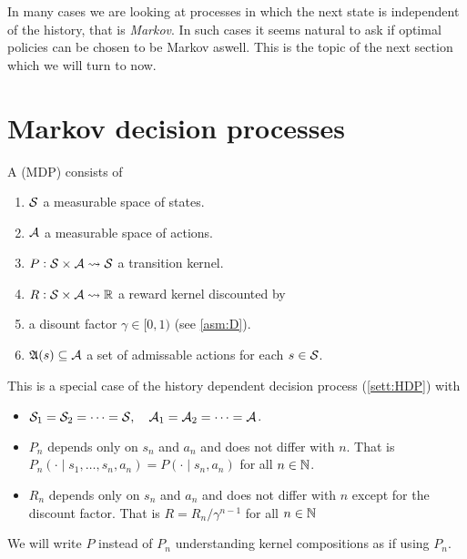 In many cases we are looking at processes
in which the next state is independent of the history,
that is \emph{Markov}.
In such cases it seems natural to ask if optimal policies can be chosen
to be Markov aswell.
This is the topic of the next section which we will turn to now.

\section{Markov decision processes}

\begin{defn}
  A  (MDP) consists of
  \begin{enumerate}
    \item $\mathcal{S}$ a 
      measurable space of states.
    \item $\mathcal{A}$ a 
      measurable space of actions.
    \item $P : \mathcal{S} \times \mathcal{A} \leadsto \mathcal{S}$
      a transition kernel.
    \item $R : \mathcal{S} \times \mathcal{A} \leadsto \mathbb{R}$
      a reward kernel discounted by
    \item a disount factor $\gamma \in [0,1)$ (see \cref{asm:D}).
    \item $\frak{A}(s) \subseteq \mathcal{A}$ a set of admissable actions
      for each $s \in \mathcal{S}$.
  \end{enumerate}
  \label{sett:MDP}
\end{defn}
\begin{rem}
  This is a special case of the
  history dependent decision process (\cref{sett:HDP}) with
  \begin{itemize}
    \item 
      $\mathcal{S}_1 = \mathcal{S}_2 = \dots = \mathcal{S},
      \quad \mathcal{A}_1 = \mathcal{A}_2 = \dots = \mathcal{A}$.
    \item $P_n$ depends only on $s_n$ and $a_n$ and does not
      differ with $n$. That is
      $P_n(\cdot \mid s_1, \dots, s_n, a_n) = P(\cdot \mid s_n, a_n)$
      for all $n \in \mathbb{N}$.
    \item $R_n$ depends only on $s_n$ and $a_n$ and does not differ
      with $n$ except for the discount factor.
      That is $R = R_n/\gamma^{n-1}$ for all $n \in \mathbb{N}$
  \end{itemize}
  We will write $P$ instead of $P_n$ understanding
  kernel compositions as if using $P_n$.
\end{rem}

